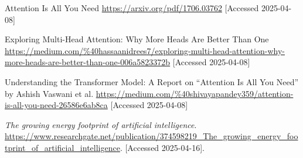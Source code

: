 \documentclass[licencjacka,en]{pracamgr}
\begin{document}
\begin{thebibliography}{99}
    Attention Is All You Need
    \url{https://arxiv.org/pdf/1706.03762} 
    [Accessed 2025-04-08]
    
    Exploring Multi-Head Attention: Why More Heads Are Better Than One
    \url{https://medium.com/%40hassaanidrees7/exploring-multi-head-attention-why-more-heads-are-better-than-one-006a5823372b}
    [Accessed 2025-04-08]
    
    Understanding the Transformer Model: A Report on “Attention Is All You Need” by Ashish Vaswani et al.
    \url{https://medium.com/%40shivayapandey359/attention-is-all-you-need-26586e6ab8ca}
    [Accessed 2025-04-08]

    \textit{The growing energy footprint of artificial intelligence}.
    \url{https://www.researchgate.net/publication/374598219_The_growing_energy_footprint_of_artificial_intelligence}.
    [Accessed 2025-04-16].
        
    
    \end{thebibliography}
    
\end{document}
